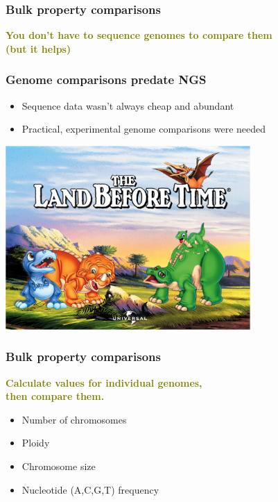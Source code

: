
%
\begin{frame}
  \frametitle{Bulk property comparisons}
  \Large{
    \textcolor{olive}{
      \textbf{
      You don't have to sequence genomes to compare them \\
      (but it helps) \\
      }
    }
  }
\end{frame}

%
\begin{frame}
  \frametitle{Genome comparisons predate NGS}
  \begin{itemize}
    \item Sequence data wasn't always cheap and abundant
    \item Practical, experimental genome comparisons were needed
  \end{itemize}
  \begin{center}
    \includegraphics[width=0.7\textwidth]{images/land_before_time}
  \end{center}  
\end{frame}

%
\begin{frame}
  \frametitle{Bulk property comparisons}
  \Large{
    \textcolor{olive}{
      \textbf{
      Calculate values for individual genomes, \\
      then compare them.
      }
    }
  }
  \normalsize{
        \begin{itemize}
         \item \textcolor{hutton_green}{Number of chromosomes}
         \item \textcolor{hutton_blue}{Ploidy}
         \item \textcolor{RawSienna}{Chromosome size}
         \item \textcolor{hutton_purple}{Nucleotide (A,C,G,T) frequency}        
        \end{itemize}
  }
\end{frame}

